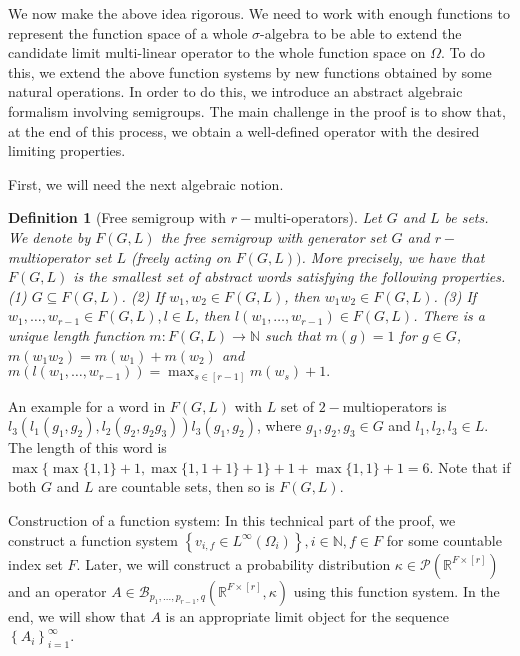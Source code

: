 \documentclass[11pt]{article}
\newtheorem{definition}[theorem]{Definition}
\begin{document}
We now make the above idea rigorous. %
We need to work with enough functions to represent the function space of a whole $\sigma$-algebra to be able to extend the candidate limit multi-linear operator to the whole function space on $\Omega$. To do this, we extend the above function systems by new functions obtained by some natural operations. In order to do this, we introduce an abstract algebraic formalism involving semigroups. The main challenge in the proof is to show that, at the end of this process, we obtain a well-defined operator with the desired limiting properties.

First, we will need the next algebraic notion.
\begin{definition}[Free semigroup with $r-$multi-operators]\label{FreeSemigroupDef}
Let $G$ and $L$ be sets. We denote by $F(G, L)$ the free semigroup with generator set $G$ and $r-$multioperator set $L$ (freely acting on $F(G, L))$. More precisely, we have that $F(G, L)$ is the smallest set of abstract words satisfying the following properties.
(1) $G \subseteq F(G, L)$.
(2) If $w_{1}, w_{2} \in F(G, L)$, then $w_{1} w_{2} \in F(G, L)$.
(3) If $w_1,\ldots, w_{r-1} \in F(G, L), l \in L$, then $l(w_1,\ldots,w_{r-1}) \in F(G, L)$. There is a unique length function $m: F(G, L) \rightarrow \mathbb{N}$ such that $m(g)=1$ for $g \in G$, $m\left(w_{1} w_{2}\right)=m\left(w_{1}\right)+m\left(w_{2}\right)$ and $m(l(w_1,\ldots,w_{r-1}))=\max_{s\in [r-1] }m(w_s)+1 .$
\end{definition} 

An example for a word in $F(G, L)$ with $L$ set of  $2-$multioperators is $l_{3}\left(l_{1}\left(g_{1} ,g_{2}\right), l_{2}\left(g_{2} ,g_{2}g_{3}\right)\right) l_{3}\left(g_{1},g_{2}\right) $, where $g_{1}, g_{2}, g_{3} \in G$ and $l_{1}, l_{2}, l_{3} \in L$. The length of this word is $\max\{\max\{1,1\}+1,\max\{1,1+1\}+1\}+1+\max\{1,1\}+1=6$. Note that if both $G$ and $L$ are countable sets, then so is $F(G, L)$.\newline

Construction of a function system: In this technical part of the proof, we construct a function system $\left\{v_{i, f} \in L^{\infty}\left(\Omega_{i}\right)\right\}, i \in \mathbb{N}, f \in F$ for some countable index set $F$. Later, we will construct a probability distribution $\kappa \in \mathcal{P}\left(\mathbb{R}^{F \times[r]}\right)$ and an operator $A \in \mathcal{B}_{p_1,\ldots,p_{r-1}, q}\left(\mathbb{R}^{F \times[r]}, \kappa\right)$ using this function system. In the end, we will show that $A$ is an appropriate limit object for the sequence $\left\{A_{i}\right\}_{i=1}^{\infty}$.\newline
\end{document}
